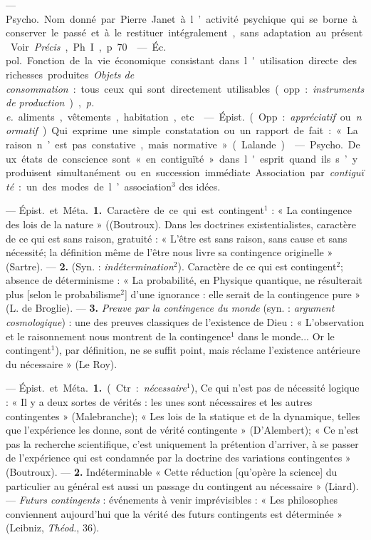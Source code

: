 \begin{itemize}[leftmargin=1cm, label=, itemsep=11pt]
 — \si{Psycho.}
Nom donné par Pierre Janet à l’activité psychique qui se borne à conserver le passé et à le restituer intégralement, sans adaptation au présent. Voir  {\it Précis}, Ph. I, p. 70.

 — \si{Éc. pol.} Fonction
de la vie économique consistant
dans l'utilisation directe des richesses produites. {\it Objets de consommation} : tous ceux qui sont directement utilisables (opp. : {\it instruments
de production}), {\it p. e.} aliments, vêtements, habitation, etc.

 — \si{Épist.} (Opp. : {\it appréciatif}
ou {\it normatif}). Qui exprime une
simple constatation ou un rapport
de fait : « La raison n’est pas constative, mais normative » (Lalande).

 — \si{Psycho.} Deux états de
conscience sont « en contiguïté »
dans l'esprit quand ils s’y produisent simultanément ou en succession
immédiate. Association par {\it contiguïté} : un des modes de l’association$^3$ des idées.

 — \si{Épist.} et \si{Méta.} {\bf 1.} Caractère de ce qui est contingent$^1$ :
« La contingence des lois de la
nature » ((Boutroux). Dans les doctrines existentialistes, caractère de
ce qui est sans raison, gratuité :
« L’être est sans raison, sans cause et
sans nécessité; la définition même
de l’être nous livre sa contingence
originelle » (Sartre). — {\bf 2.} (Syn. :
{\it indétermination}$^2$). Caractère de ce
qui est contingent$^2$; absence de déterminisme : « La probabilité, en
Physique quantique, ne résulterait
plus [selon le probabilisme$^2$] d’une
ignorance : elle serait de la contingence pure » (L. de Broglie). — {\bf 3.}
{\it Preuve par la contingence du monde}
(syn. : {\it argument cosmologique}) : une
des preuves classiques de l’existence de Dieu : « L'observation et
le raisonnement nous montrent de
la contingence$^1$ dans le monde... Or
le contingent$^1$), par définition, ne se
suffit point, mais réclame l’existence antérieure du nécessaire » (Le
Roy).

 — \si{Épist.} et \si{Méta.} {\bf 1.} (Ctr. :
{\it nécessaire}$^1$), Ce qui n'est pas de nécessité logique : « Il y a deux sortes
de vérités : les unes sont nécessaires
et les autres contingentes » (Malebranche); « Les lois de la statique
et de la dynamique, telles que l’expérience les donne, sont de vérité
contingente » (D’Alembert); « Ce
n’est pas la recherche scientifique,
c’est uniquement la prétention d’arriver, à se passer de l'expérience qui
est condamnée par la doctrine des
variations contingentes » (Boutroux). — {\bf 2.} Indéterminable
« Cette réduction [qu’opère la science]
du particulier au général est aussi
un passage du contingent au nécessaire » (Liard). — {\it Futurs contingents} : événements à venir imprévisibles : « Les philosophes conviennent aujourd'hui que la vérité des
futurs contingents est déterminée »
(Leibniz, {\it Théod.}, 36).


\end{itemize}
